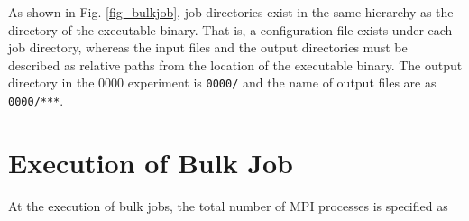 As shown in Fig. \ref{fig_bulkjob}, job directories exist in the same hierarchy as the directory of the executable binary. That is, a configuration file exists under each job directory, whereas the input files and the output directories must be described as relative paths from the location of  the executable binary. The output directory in the 0000 experiment is \verb|0000/| and the name of output files are as \verb|0000/***|. {\color{blue}{ Note that when the file name is common to all experiments without adding the name of job directory, the output is written to the same file, and the data disappear as a result.
}}




\section{Execution of Bulk Job}

At the execution of bulk jobs, the total number of MPI processes is specified as

